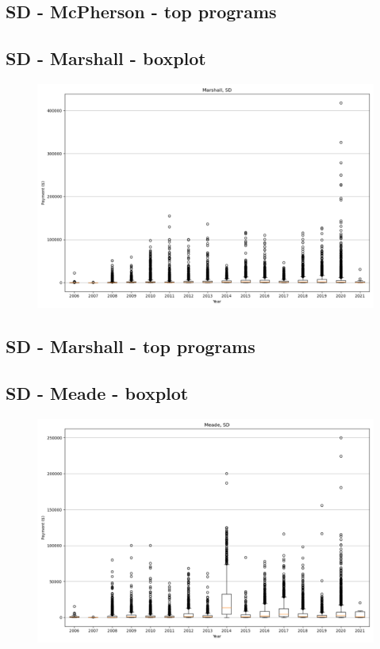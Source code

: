 \subsection*{SD - McPherson - top programs}

\newpage
\subsection*{SD - Marshall - boxplot}
\begin{figure}[h]
\centering
\includegraphics[width=7in]{../output/boxplots/counties/Marshall-SD_boxplot.png}
\end{figure}


\subsection*{SD - Marshall - top programs}

\newpage
\subsection*{SD - Meade - boxplot}
\begin{figure}[h]
\centering
\includegraphics[width=7in]{../output/boxplots/counties/Meade-SD_boxplot.png}
\end{figure}


